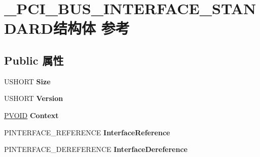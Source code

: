 \hypertarget{struct___p_c_i___b_u_s___i_n_t_e_r_f_a_c_e___s_t_a_n_d_a_r_d}{}\section{\+\_\+\+P\+C\+I\+\_\+\+B\+U\+S\+\_\+\+I\+N\+T\+E\+R\+F\+A\+C\+E\+\_\+\+S\+T\+A\+N\+D\+A\+R\+D结构体 参考}
\label{struct___p_c_i___b_u_s___i_n_t_e_r_f_a_c_e___s_t_a_n_d_a_r_d}
\subsection*{Public 属性}
\begin{DoxyCompactItemize}
\item 
\mbox{\label{struct___p_c_i___b_u_s___i_n_t_e_r_f_a_c_e___s_t_a_n_d_a_r_d_acad830395d068f7ee976462f806ac1f6}} 
U\+S\+H\+O\+RT {\bfseries Size}
\item 
\mbox{\label{struct___p_c_i___b_u_s___i_n_t_e_r_f_a_c_e___s_t_a_n_d_a_r_d_ad3cd68b1edd073095c23c368c01e0d4e}} 
U\+S\+H\+O\+RT {\bfseries Version}
\item 
\mbox{\label{struct___p_c_i___b_u_s___i_n_t_e_r_f_a_c_e___s_t_a_n_d_a_r_d_ab479f80c0750ac0da4c846409d513c63}} 
\hyperlink{interfacevoid}{P\+V\+O\+ID} {\bfseries Context}
\item 
\mbox{\label{struct___p_c_i___b_u_s___i_n_t_e_r_f_a_c_e___s_t_a_n_d_a_r_d_a6f897ee856f30961fd1bb660fffc7786}} 
P\+I\+N\+T\+E\+R\+F\+A\+C\+E\+\_\+\+R\+E\+F\+E\+R\+E\+N\+CE {\bfseries Interface\+Reference}
\item 
\mbox{\label{struct___p_c_i___b_u_s___i_n_t_e_r_f_a_c_e___s_t_a_n_d_a_r_d_a2a5a1f05cd9f547f99dab5e14f5d5984}} 
P\+I\+N\+T\+E\+R\+F\+A\+C\+E\+\_\+\+D\+E\+R\+E\+F\+E\+R\+E\+N\+CE {\bfseries Interface\+Dereference}
\item 
\mbox{\label{struct___p_c_i___b_u_s___i_n_t_e_r_f_a_c_e___s_t_a_n_d_a_r_d_a5b00f8314251901c104d9df73343100e}} 

\end{DoxyCompactItemize}
